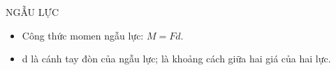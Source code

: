 \begin{dang}{NGẪU LỰC}
\begin{itemize}
\item Công thức momen ngẫu lực: $M=Fd$.
\item d là cánh tay đòn của ngẫu lực; là khoảng cách giữa hai giá của hai lực.
\end{itemize}
\end{dang}